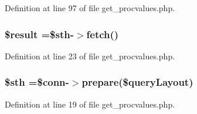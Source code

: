 Definition at line 97 of file get\-\_\-procvalues.\-php.

\hypertarget{get__procvalues_8php_a112ef069ddc0454086e3d1e6d8d55d07}{
\subsubsection[{\$result}]{\setlength{\rightskip}{0pt plus 5cm}\$result =\$sth-\/$>$fetch()}}\label{get__procvalues_8php_a112ef069ddc0454086e3d1e6d8d55d07}


Definition at line 23 of file get\-\_\-procvalues.\-php.

\hypertarget{get__procvalues_8php_afa9126f9664959c02795be300a135f93}{
\subsubsection[{\$sth}]{\setlength{\rightskip}{0pt plus 5cm}\$sth =\$conn-\/$>$prepare(\$query\-Layout)}}\label{get__procvalues_8php_afa9126f9664959c02795be300a135f93}


Definition at line 19 of file get\-\_\-procvalues.\-php.

